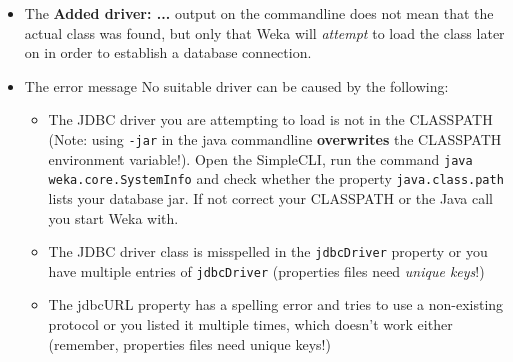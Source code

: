 \begin{itemize}
	\item The \textbf{Added driver: ...} output on the commandline does not mean that the actual class was found, but only that Weka will \textit{attempt} to load the class later on in order to establish a database connection.

	\item The error message No suitable driver can be caused by the following:
	\begin{itemize}
		\item The JDBC driver you are attempting to load is not in the CLASSPATH (Note: using \texttt{-jar} in the java commandline \textbf{overwrites} the CLASSPATH environment variable!). Open the SimpleCLI, run the command \texttt{java weka.core.SystemInfo} and check whether the property \texttt{java.class.path} lists your database jar. If not correct your CLASSPATH or the Java call you start Weka with.
		\item The JDBC driver class is misspelled in the \texttt{jdbcDriver} property or you have multiple entries of \texttt{jdbcDriver} (properties files need \textit{unique keys}!)
		\item The jdbcURL property has a spelling error and tries to use a non-existing protocol or you listed it multiple times, which doesn't work either (remember, properties files need unique keys!)
	\end{itemize}
\end{itemize}

